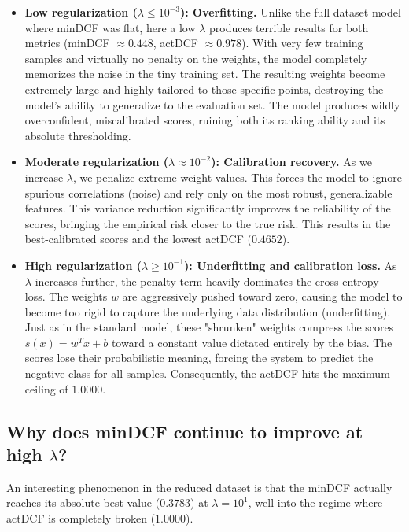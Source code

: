\begin{itemize}
    \item \textbf{Low regularization ($\lambda \le 10^{-3}$): Overfitting.} 
    Unlike the full dataset model where minDCF was flat, here a low $\lambda$ produces terrible results for both metrics (minDCF $\approx 0.448$, actDCF $\approx 0.978$). With very few training samples and virtually no penalty on the weights, the model completely memorizes the noise in the tiny training set. The resulting weights become extremely large and highly tailored to those specific points, destroying the model's ability to generalize to the evaluation set. The model produces wildly overconfident, miscalibrated scores, ruining both its ranking ability and its absolute thresholding.

    \item \textbf{Moderate regularization ($\lambda \approx 10^{-2}$): Calibration recovery.} 
    As we increase $\lambda$, we penalize extreme weight values. This forces the model to ignore spurious correlations (noise) and rely only on the most robust, generalizable features. This variance reduction significantly improves the reliability of the scores, bringing the empirical risk closer to the true risk. This results in the best-calibrated scores and the lowest actDCF ($0.4652$).

    \item \textbf{High regularization ($\lambda \ge 10^{-1}$): Underfitting and calibration loss.} 
    As $\lambda$ increases further, the penalty term heavily dominates the cross-entropy loss. The weights $w$ are aggressively pushed toward zero, causing the model to become too rigid to capture the underlying data distribution (underfitting). Just as in the standard model, these "shrunken" weights compress the scores $s(x) = w^Tx + b$ toward a constant value dictated entirely by the bias. The scores lose their probabilistic meaning, forcing the system to predict the negative class for all samples. Consequently, the actDCF hits the maximum ceiling of $1.0000$.
\end{itemize}

\subsection*{Why does minDCF continue to improve at high $\lambda$?}
An interesting phenomenon in the reduced dataset is that the minDCF actually reaches its absolute best value ($0.3783$) at $\lambda = 10^{1}$, well into the regime where actDCF is completely broken ($1.0000$). 

